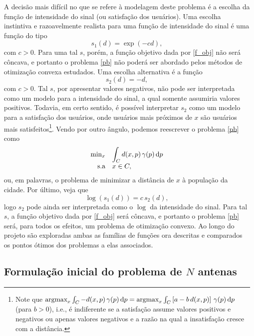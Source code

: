 \documentclass[a4paper,12pt]{article}
\begin{document}
A decisão mais difícil no que se refere à modelagem deste problema é a escolha da função de intensidade do sinal (ou satisfação dos usuários). Uma escolha instintiva e razoavelmente realista para uma função de intensidade do sinal é uma função do tipo 
\begin{equation*}
	s_1(d) = \exp(-cd),
\end{equation*}
com $c > 0$. Para uma tal $s$, porém, a função objetivo dada por \eqref{f_obj} não será côncava, e portanto o problema \eqref{pb} não poderá ser abordado pelos métodos de otimização convexa estudados. Uma escolha alternativa é a função
\begin{equation*}
	s_2(d) = -d,
\end{equation*}
com $c > 0$. Tal $s$, por apresentar valores negativos, não pode ser interpretada como um modelo para a intensidade do sinal, a qual somente assumiria valores positivos. Todavia, em certo sentido, é possível interpretar $s_2$ como um modelo para a satisfação dos usuários, onde usuários mais próximos de $x$ são usuários mais satisfeitos\footnote{Note que $\text{argmax}_x \int_C -d(x,p) \, \gamma(p) \, \text{d}p = \text{argmax}_x \int_C \left[a - b \, d(x,p) \right] \, \gamma(p) \, \text{d}p$ (para $b > 0$), i.e., é indiferente se a satisfação assume valores positivos e negativos ou apenas valores negativos e a razão na qual a insatisfação cresce com a distância.}. Vendo por outro ângulo, podemos reescrever o problema \eqref{pb} como
\begin{equation*}
	\begin{array}{rl}
		\min_{x} & \displaystyle \int_C d(x,p) \, \gamma(p) \,\text{d}p \\[0.5ex]
		\text{s.a} & x \in C ,
	\end{array}
\end{equation*}
ou, em palavras, o problema de minimizar a distância de $x$ à população da cidade. Por último, veja que
\begin{equation*}
	\log(s_1(d)) = c \, s_2(d) ,
\end{equation*}
logo $s_2$ pode ainda ser interpretada como o $\log$ da intensidade do sinal. Para tal $s$, a função objetivo dada por \eqref{f_obj} será côncava, e portanto o problema \eqref{pb} será, para todos os efeitos, um problema de otimização convexo. Ao longo do projeto são exploradas ambas as famílias de funções ora descritas e comparados os pontos ótimos dos problemas a elas associados.

\subsection{Formulação inicial do problema de $N$ antenas}
\end{document}
